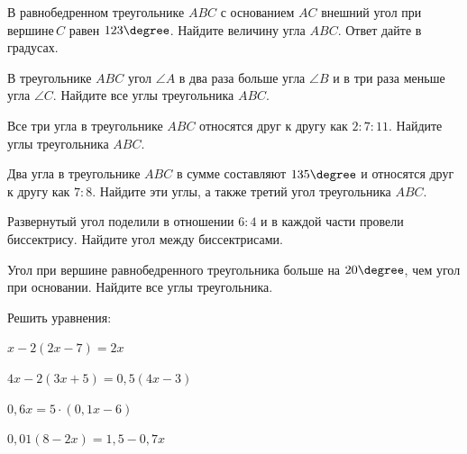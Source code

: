 %
%
%
\begin{homework}[number=2]
		\begin{listofex}
			\item В равнобедренном треугольнике \(ABC\) с основанием \(AC\) внешний угол при вершине \(C\) равен \(123 \degree \). Найдите величину угла \(ABC\). Ответ дайте в градусах.
			\item В треугольнике \( ABC \) угол \( \angle A \) в два раза больше угла \( \angle B \) и в три раза меньше угла \( \angle C \). Найдите все углы треугольника \( ABC \).
			\item Все три угла в треугольнике \( ABC \) относятся друг к другу как \( 2:7:11 \). Найдите углы треугольника \( ABC \).
			\item Два угла в треугольнике \( ABC \) в сумме составляют \( 135\degree \) и относятся друг к другу как \( 7:8 \). Найдите эти углы, а также третий угол треугольника \( ABC \).
			\item Развернутый угол поделили в отношении \( 6:4 \) и в каждой части провели биссектрису. Найдите угол между биссектрисами.
			\item Угол при вершине равнобедренного треугольника больше на \(20 \degree\), чем угол при основании. Найдите все углы треугольника.
			\item Решить уравнения:
			\begin{enumcols}[itemcolumns=2]
				\item \( x-2(2x-7)=2x \)
				\item \( 4x-2(3x+5)=0,5(4x-3) \)
				\item \( 0,6x=5 \cdot (0,1x-6) \)
				\item \( 0,01(8-2x)=1,5-0,7x \)
		\end{enumcols}
	\end{listofex}
\end{homework}
%
%
